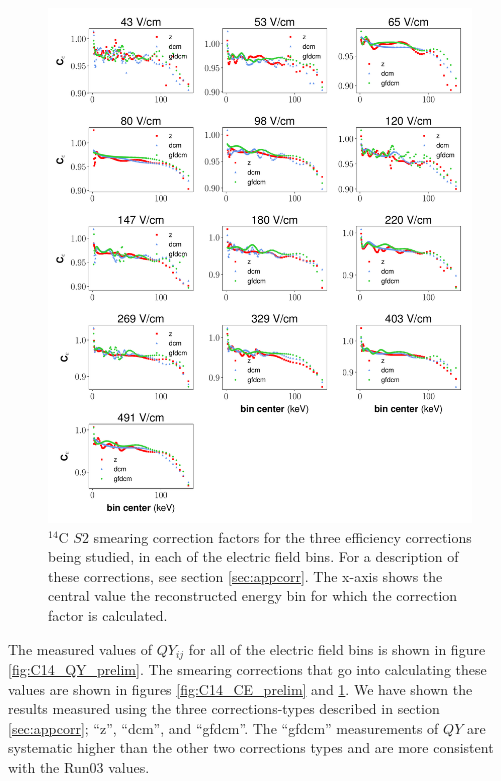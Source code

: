 \begin{figure}[h!]
\centering
\includegraphics[width=\textwidth]{Figures/C14_Ce_prelim.pdf}
\caption{$^{14}$C $S2$ smearing correction factors for the three efficiency corrections being studied, in each of the electric field bins. For a description of these corrections, see section \ref{sec:appcorr}. The x-axis shows the central value the reconstructed energy bin for which the correction factor is calculated.}
\label{fig:C14_Ce_prelim}
\end{figure}
The measured values of $QY_{ij}$ for all of the electric field bins is shown in figure \ref{fig:C14_QY_prelim}. The smearing corrections that go into calculating these values are shown in figures \ref{fig:C14_CE_prelim} and \ref{fig:C14_Ce_prelim}. We have shown the results measured using the three corrections-types described in section \ref{sec:appcorr}; ``z'', ``dcm'', and ``gfdcm''. The ``gfdcm'' measurements of $QY$ are systematic higher than the other two corrections types and are more consistent with the Run03 values.

